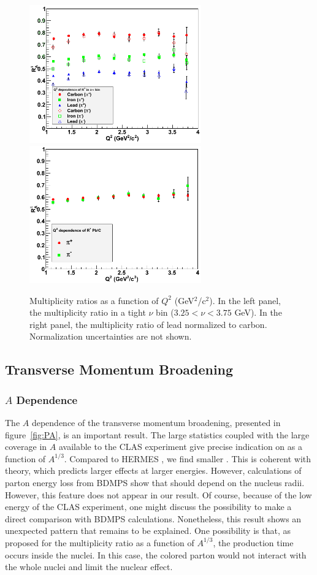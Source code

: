 \begin{figure}[tbp]
\centering
\includegraphics[width=7.4cm] {chap6-fig/F_RvQ2inNu.png} 
\includegraphics[width=7.4cm] {chap6-fig/F_RvQ2_PbC.png} 
\caption {Multiplicity ratios as a function of $Q^2$ (GeV$^2$/c$^2$). In the left panel,
the multiplicity ratio in a tight $\nu$ bin ($3.25 < \nu < 3.75$ GeV). In the right 
panel, the multiplicity ratio of lead normalized to carbon. Normalization 
uncertainties are not shown.}
\label{fig:RQ2Detailed}
\end{figure}

\subsection{Transverse Momentum Broadening}

\subsubsection{$A$ Dependence}

The $A$ dependence of the transverse momentum broadening, presented in 
figure~\ref{fig:PA}, is an important result. The large statistics coupled with the 
large coverage in $A$ available to the CLAS experiment give precise indication on \dpt 
as a function of $A^{1/3}$. Compared to HERMES \cite{Airapetian:2009jy}, we
find smaller \dptp. This is coherent with theory, which predicts larger effects
at larger energies. However, calculations of parton energy loss from BDMPS 
\cite{Baier:1996sk} show that \pt should depend on the nucleus radii. However, 
this feature does not appear in our 
result. Of course, because of the low energy of the CLAS experiment, one might 
discuss the possibility to make a direct comparison with BDMPS calculations. Nonetheless, 
this result shows an unexpected pattern that remains to be explained. One 
possibility is that, as proposed for the multiplicity ratio as a function of 
$A^{1/3}$, the production time occurs inside the nuclei. In this case, the 
colored parton would not interact with the whole nuclei and limit the nuclear 
effect.

